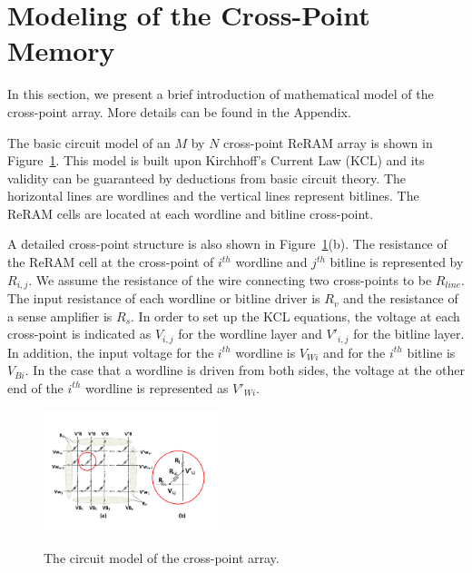 \section{Modeling of the Cross-Point Memory}\label{sec:model}

In this section, we present a brief introduction of mathematical model of
the cross-point array. More details can be found in the Appendix.

The basic circuit model of an $M$ by $N$ cross-point ReRAM array is shown
in Figure~\ref{fig:modeling}. This model is built upon Kirchhoff's Current
Law (KCL) and its validity can be guaranteed by deductions from basic
circuit theory. The horizontal lines are wordlines and the vertical lines
represent bitlines. The ReRAM cells are located at each wordline and
bitline cross-point.

A detailed cross-point structure is also shown in
Figure~\ref{fig:modeling}(b). The resistance of the ReRAM cell at the
cross-point of $i^{th}$ wordline and $j^{th}$ bitline is represented by
$R_{i,j}$. We assume the resistance of the wire connecting two
cross-points to be $R_{line}$. The input resistance of each wordline or
bitline driver is $R_v$ and the resistance of a sense amplifier is $R_s$.
In order to set up the KCL equations, the voltage at each cross-point is
indicated as $V_{i,j}$ for the wordline layer and $V'_{i,j}$ for the
bitline layer. In addition, the input voltage for the $i^{th}$ wordline is
$V_{Wi}$ and for the $i^{th}$ bitline is $V_{Bi}$. In the case that a
wordline is driven from both sides, the voltage at the other end of the
$i^{th}$ wordline is represented as $V'_{Wi}$.


\begin{figure}%
\centering
  \includegraphics[width=0.45\textwidth]{./figures/model_f.pdf}\\
  \caption{The circuit model of the cross-point array.}\label{fig:modeling}
  \vspace{-12pt}
\end{figure}

